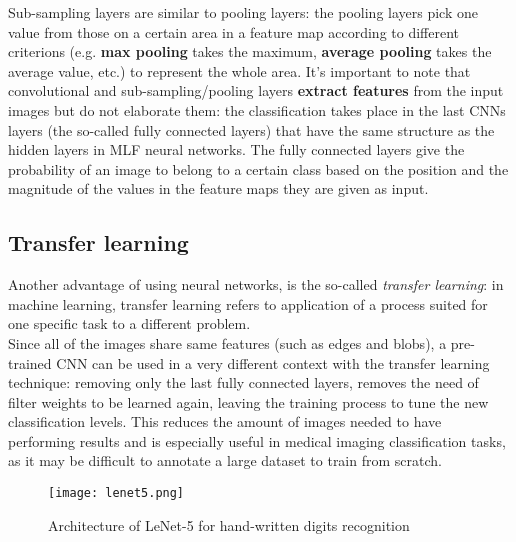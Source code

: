 \documentclass[../main.tex]{subfiles}
\begin{document}
Sub-sampling layers are similar to pooling layers: the pooling layers pick one value from those on a certain area in a feature map according to different criterions (e.g. \textbf{max pooling} takes the maximum, \textbf{average pooling} takes the average value, etc.) to represent the whole area. 
It's important to note that convolutional and sub-sampling/pooling layers \textbf{extract features} from the input images but do not elaborate them: the classification takes place in the last CNNs layers (the so-called fully connected layers) that have the same structure as the hidden layers in MLF neural networks. 
The fully connected layers give the probability of an image to belong to a certain class based on the position and the magnitude of the values in the feature maps they are given as input. \\ 


\subsection{Transfer learning}
Another advantage of using neural networks, is the so-called \textit{transfer learning}: in machine learning, transfer learning refers to application of a process suited for one specific task to a different problem. \cite{Lakhani2018} \\ Since all of the images share same features (such as edges and blobs), a pre-trained CNN can be used in a very different context with the transfer learning technique: removing only the last fully connected layers, removes the need of filter weights to be learned again, leaving the training process to tune the new classification levels. This reduces the amount of images needed to have performing results and is especially useful in medical imaging classification tasks, as it may be difficult to annotate a large dataset to train from scratch. \cite{Lakhani2018} 

\clearpage
\newpage 

\begin{figure}[H]
  \centering
  \texttt{[image: lenet5.png]}
  \caption{Architecture of LeNet-5 for hand-written digits recognition \cite{LeCun1998}}
  \label{fig:lenet5}
\end{figure}
\end{document}
